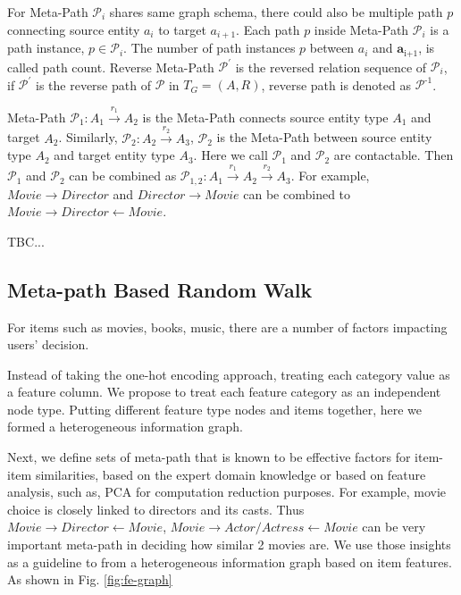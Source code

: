 For Meta-Path $\mathcal{P}_i$ shares same graph schema, there could also be multiple path $p$ connecting source entity $a_i$ to target ${a}_{i+1}$. Each path $p$ inside Meta-Path $\mathcal{P}_i$ is a path instance, $p \in \mathcal{P}_i$. The number of path instances $p$ between $a_i$ and $\bm{a}_\text{i+1}$, is called path count. Reverse Meta-Path $\mathcal{P}^{'}$ is the reversed relation sequence of $\mathcal{P}_i$, if $\mathcal{P}^{'}$ is the reverse path of $\mathcal{P}$ in $T_G = (A, R)$, reverse path is denoted as $\mathcal{P}^\text{-1}$. \newline

Meta-Path $\mathcal{P}_1: A_1 \xrightarrow{r_1} A_2$ is the Meta-Path connects source entity type $A_1$ and target $A_2$.
Similarly, $\mathcal{P}_2: A_2 \xrightarrow{r_2} A_3$, $\mathcal{P}_2$ is the Meta-Path between source entity type $A_\text{2}$ and target entity type $A_\text{3}$.
Here we call $\mathcal{P}_1$ and $\mathcal{P}_2$ are contactable. Then $\mathcal{P}_1$ and $\mathcal{P}_2$ can be combined as $\mathcal{P}_{1,2}: A_1 \xrightarrow{r_1} A_2 \xrightarrow{r_2} A_3$. For example, $Movie \rightarrow Director$ and $Director \rightarrow Movie$ can be combined to $Movie \rightarrow Director \leftarrow Movie$. 

TBC...

\subsection{Meta-path Based Random Walk}\label{3MF}

For items such as movies, books, music, there are a number of factors impacting users' decision. 

Instead of taking the one-hot encoding approach, treating each category value as a feature column. We propose to treat each feature category as an independent node type. Putting different feature type nodes and items together, here we formed a heterogeneous information graph. 

Next, we define sets of meta-path that is known to be effective factors for item-item similarities, based on the expert domain knowledge or based on feature analysis, such as, PCA for computation reduction purposes. For example, movie choice is closely linked to directors and its casts. Thus $Movie \rightarrow Director \leftarrow Movie$, $Movie \rightarrow Actor/Actress \leftarrow Movie$  can be very important meta-path in deciding how similar 2 movies are. We use those insights as a guideline to from a heterogeneous information graph based on item features. As shown in Fig. \ref{fig:fe-graph}

